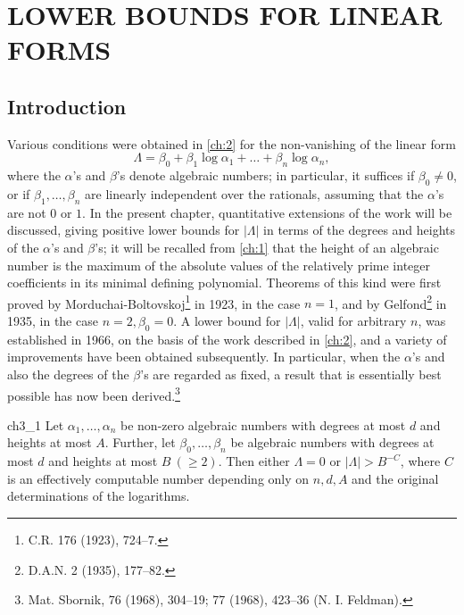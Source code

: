 
\chapter{LOWER BOUNDS FOR LINEAR FORMS}\label{ch:3}

\section{Introduction}\label{sec:ch3_1}

Various conditions were obtained in \autoref{ch:2} for the non-vanishing of the linear form
\[
\Lambda = \beta_0 + \beta_1 \log \alpha_1 + \dots + \beta_n \log \alpha_n,
\]
where the $\alpha$'s and $\beta$'s denote algebraic numbers; in particular, it suffices if $\beta_0 \neq 0$, or if $\beta_1, \dots, \beta_n$ are linearly independent over the rationals, assuming that the $\alpha$'s are not $0$ or $1$. In the present chapter, quantitative extensions of the work will be discussed, giving positive lower bounds for $|\Lambda|$ in terms of the degrees and heights of the $\alpha$'s and $\beta$'s; it will be recalled from \autoref{ch:1} that the height of an algebraic number is the maximum of the absolute values of the relatively prime integer coefficients in its minimal defining polynomial. Theorems of this kind were first proved by Morduchai-Boltovskoj\footnote{C.R. 176 (1923), 724--7.} in 1923, in the case $n=1$, and by Gelfond\footnote{D.A.N. 2 (1935), 177--82.} in 1935, in the case $n=2, \beta_0=0$. A lower bound for $|\Lambda|$, valid for arbitrary $n$, was established in 1966, on the basis of the work described in \autoref{ch:2}, and a variety of improvements have been obtained subsequently. In particular, when the $\alpha$'s and also the degrees of the $\beta$'s are regarded as fixed, a result that is essentially best possible has now been derived.\footnote{Mat. Sbornik, 76 (1968), 304--19; 77 (1968), 423--36 (N. I. Feldman).}

\begin{mythm}{}{ch3_1}
Let $\alpha_1, \dots, \alpha_n$ be non-zero algebraic numbers with degrees at most $d$ and heights at most $A$. Further, let $\beta_0, \dots, \beta_n$ be algebraic numbers with degrees at most $d$ and heights at most $B \ (\ge 2)$. Then either $\Lambda = 0$ or $|\Lambda| > B^{-C}$, where $C$ is an effectively computable number depending only on $n, d, A$ and the original determinations of the logarithms.
\end{mythm}

